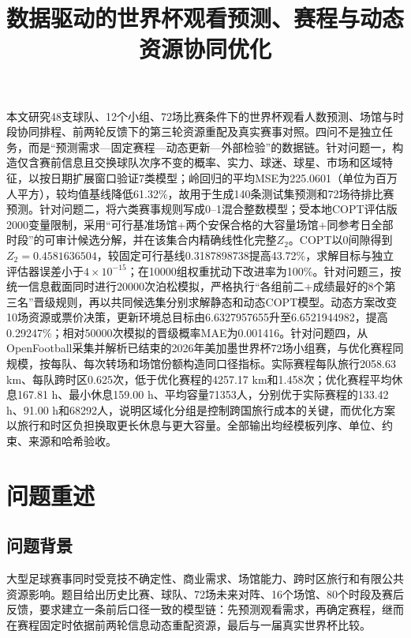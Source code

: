 \documentclass[UTF8,a4paper,zihao=-4,fontset=fandol]{ctexart}
\title{数据驱动的世界杯观看预测、赛程与动态资源协同优化}
\begin{document}
\maketitle

\begin{modelabstract}
本文研究48支球队、12个小组、72场比赛条件下的世界杯观看人数预测、场馆与时段协同排程、前两轮反馈下的第三轮资源重配及真实赛事对照。四问不是独立任务，而是“预测需求---固定赛程---动态更新---外部检验”的数据链。针对问题一，构造仅含赛前信息且交换球队次序不变的概率、实力、球迷、球星、市场和区域特征，以按日期扩展窗口验证7类模型；岭回归的平均MSE为225.0601（单位为百万人平方），较均值基线降低61.32\%，故用于生成140条测试集预测和72场待排比赛预测。针对问题二，将六类赛事规则写成0--1混合整数模型；受本地COPT评估版2000变量限制，采用“可行基准场馆+两个安保合格的大容量场馆+同参考日全部时段”的可审计候选分解，并在该集合内精确线性化完整$Z_2$。COPT以0间隙得到$Z_2=0.4581636504$，较固定可行基线0.3187898738提高43.72\%，求解目标与独立评估器误差小于$4\times10^{-15}$；在10000组权重扰动下改进率为100\%。针对问题三，按统一信息截面同时进行20000次泊松模拟，严格执行“各组前二+成绩最好的8个第三名”晋级规则，再以共同候选集分别求解静态和动态COPT模型。动态方案改变10场资源或票价决策，更新环境总目标由6.6327957655升至6.6521944982，提高0.29247\%；相对50000次模拟的晋级概率MAE为0.001416。针对问题四，从OpenFootball采集并解析已结束的2026年美加墨世界杯72场小组赛，与优化赛程同规模，按每队、每次转场和场馆份额构造同口径指标。实际赛程每队旅行2058.63 km、每队跨时区0.625次，低于优化赛程的4257.17 km和1.458次；优化赛程平均休息167.81 h、最小休息159.00 h、平均容量71353人，分别优于实际赛程的133.42 h、91.00 h和68292人，说明区域化分组是控制跨国旅行成本的关键，而优化方案以旅行和时区负担换取更长休息与更大容量。全部输出均经模板列序、单位、约束、来源和哈希验收。

\end{modelabstract}

\clearpage
\section{问题重述}
\subsection{问题背景}
大型足球赛事同时受竞技不确定性、商业需求、场馆能力、跨时区旅行和有限公共资源影响。题目给出历史比赛、球队、72场未来对阵、16个场馆、80个时段及赛后反馈，要求建立一条前后口径一致的模型链：先预测观看需求，再确定赛程，继而在赛程固定时依据前两轮信息动态重配资源，最后与一届真实世界杯比较。
\end{document}
